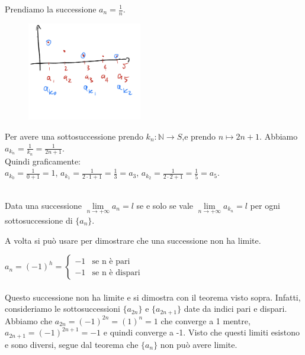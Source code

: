 \begin{example}
Prendiamo la successione $a_n = \frac{1}{n}$.
\end{example}
\begin{figure}
    \vspace{-40pt}
    \centering
    \includegraphics[width=5cm]{images/esempio-sottosuccessioni.png}
\end{figure}
Per avere una sottosuccessione prendo $k_n: \mathbb{N}\to S$,e prendo $n \mapsto 2n+1$. Abbiamo $a_{k_n} = \frac{1}{k_n} = \frac{1}{2n+1}$.\\
Quindi graficamente: \\
$a_{k_0} = \frac{1}{0+1} = 1$, $a_{k_1} = \frac{1}{2\cdot 1 +1} = \frac{1}{3} = a_3$, $a_{k_2} = \frac{1}{2 \cdot 2+1} = \frac{1}{5} = a_5$.\\\\
\begin{theorem}
Data una successione $\lim\limits_{n\to +\infty}a_n = l$ se e solo se vale $\lim\limits_{n\to +\infty}a_{k_n} = l$ per ogni sottosuccessione di $\{a_n\}$.
\end{theorem}
\hspace{-15pt} A volta si può usare per dimostrare che una successione non ha limite.
\begin{example}
$a_n= (-1)^h = \begin{cases}-1 & \text{se n è pari} \\ -1 & \text{se n è dispari} \end{cases}$ \\\\
Questo successione non ha limite e si dimostra con il teorema visto sopra. Infatti, consideriamo le sottosuccessioni $\{a_{2n}\}$ e $\{a_{2n+1}\}$ date da indici pari e dispari. \\
Abbiamo che $a_{2n} = (-1)^{2n} = (1)^n = 1$ che converge a 1 mentre, $a_{2n+1} = (-1)^{2n+1} = -1$ e quindi converge a -1. Visto che questi limiti esistono e sono diversi, segue dal teorema che $\{a_n\}$ non può avere limite.
\end{example}

